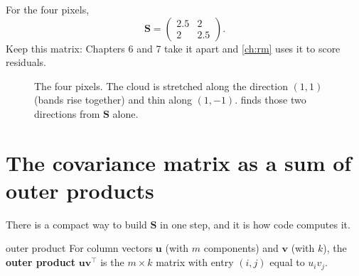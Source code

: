 \documentclass[11pt,a4paper,oneside,openany]{book}
\newcommand{\B}[1]{{\symbf{#1}}}
\newcommand{\B}[1]{{\bm{#1}}}
\newcommand{\T}{^{\top}}
\newcommand{\vu}{\B{u}}
\newcommand{\vv}{\B{v}}
\newcommand{\mS}{\B{S}}
\begin{document}
For the four pixels,
\[
  \mS=\begin{pmatrix}2.5&2\\2&2.5\end{pmatrix}.
\]
Keep this matrix: Chapters 6 and 7 take it apart and \cref{ch:rm} uses it to score residuals.

\begin{figure}[ht]
\centering
{}
\caption{The four pixels. The cloud is stretched along the direction $(1,1)$ (bands rise together) and thin along
$(1,-1)$.  finds those two directions from $\mS$ alone.}
\label{fig:cloud}
\end{figure}

\section{The covariance matrix as a sum of outer products}

There is a compact way to build $\mS$ in one step, and it is how code computes it.

\begin{defn}{outer product}
For column vectors $\vu$ (with $m$ components) and $\vv$ (with $k$), the \textbf{outer product} $\vu\vv\T$ is the $m\times k$ matrix
with entry $(i,j)$ equal to $u_iv_j$.
\end{defn}
\end{document}
